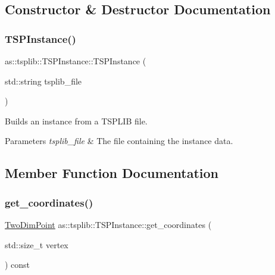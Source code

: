 \subsection{Constructor \& Destructor Documentation}
\mbox{\label{classas_1_1tsplib_1_1TSPInstance_a5cc9de2e917ae7aa608e10b4375155d6}} 
\subsubsection{\texorpdfstring{T\+S\+P\+Instance()}{TSPInstance()}}
{\footnotesize\ttfamily as\+::tsplib\+::\+T\+S\+P\+Instance\+::\+T\+S\+P\+Instance (\begin{DoxyParamCaption}\item[{std\+::string}]{tsplib\+\_\+file }\end{DoxyParamCaption})\hspace{0.3cm}{\ttfamily [inline]}}



Builds an instance from a T\+S\+P\+L\+IB file. 


\begin{DoxyParams}{Parameters}
{\em tsplib\+\_\+file} & The file containing the instance data. \\
\hline
\end{DoxyParams}


\subsection{Member Function Documentation}
\mbox{\label{classas_1_1tsplib_1_1TSPInstance_a36962fb85e309faa3efb28fae3b2956b}} 
\subsubsection{\texorpdfstring{get\+\_\+coordinates()}{get\_coordinates()}}
{\footnotesize\ttfamily \hyperlink{structas_1_1TwoDimPoint}{Two\+Dim\+Point} as\+::tsplib\+::\+T\+S\+P\+Instance\+::get\+\_\+coordinates (\begin{DoxyParamCaption}\item[{std\+::size\+\_\+t}]{vertex }\end{DoxyParamCaption}) const\hspace{0.3cm}{\ttfamily [inline]}}




